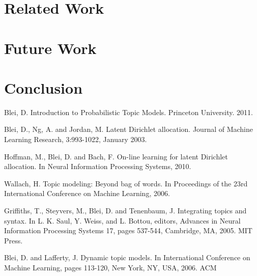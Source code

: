 \documentclass[conference]{IEEEtran}
\begin{document}
{%
\section{Related Work}

\section{Future Work}

\section{Conclusion}

\begin{thebibliography}{1}

Blei, D. Introduction to Probabilistic Topic Models. Princeton University. 2011.

Blei, D., Ng, A. and Jordan, M. Latent Dirichlet allocation. Journal of Machine Learning Research, 3:993-1022, January 2003.

Hoffman, M., Blei, D. and Bach, F. On-line learning for latent Dirichlet allocation. In Neural Information Processing Systems, 2010.

Wallach, H. Topic modeling: Beyond bag of words. In Proceedings of the 23rd International Conference on Machine Learning, 2006.

Griffiths, T., Steyvers, M., Blei, D. and Tenenbaum, J. Integrating topics and syntax. In L. K. Saul, Y. Weiss, and L. Bottou, editors, Advances in Neural Information Processing Systems 17, pages 537-544, Cambridge, MA, 2005. MIT Press.

Blei, D. and Lafferty, J. Dynamic topic models. In International Conference on Machine Learning, pages 113-120, New York, NY, USA, 2006. ACM


\end{thebibliography}}
\end{document}
